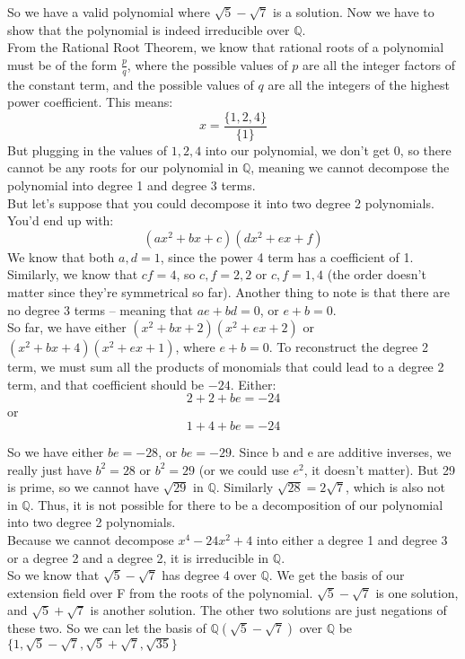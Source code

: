 \begin{enumerate}
\begin{enumerate}
        So we have a valid polynomial where $\sqrt{5} - \sqrt{7}$ is a solution. Now we have to show that the polynomial is indeed irreducible over $\mathds{Q}$.\\
        From the Rational Root Theorem, we know that rational roots of a polynomial must be of the form $\frac{p}{q}$, where the possible values of $p$ are all the integer factors of the constant term, and the possible values of $q$ are all the integers of the highest power coefficient. This means:
        $$x = \frac{\{1,2,4 \}}{\{1\}}$$
        But plugging in the values of $1,2,4$ into our polynomial, we don't get 0, so there cannot be any roots for our polynomial in $\mathds{Q}$, meaning we cannot decompose the polynomial into degree 1 and degree 3 terms.\\
        But let's suppose that you could decompose it into two degree 2 polynomials. You'd end up with:
        $$(ax^2+bx+c)(dx^2+ex+f)$$
        We know that both $a,d = 1$, since the power 4 term has a coefficient of 1. Similarly, we know that $cf = 4$, so $c,f = 2,2$ or $c,f = 1,4$ (the order doesn't matter since they're symmetrical so far). Another thing to note is that there are no degree 3 terms -- meaning that $ae + bd = 0$, or $e + b = 0$.\\
        So far, we have either $(x^2+bx+2)(x^2+ex+2)$ or $(x^2+bx+4)(x^2+ex+1)$, where $e+b = 0$.
        To reconstruct the degree 2 term, we must sum all the products of monomials that could lead to a degree 2 term, and that coefficient should be $-24$. Either:
        $$2+2+be = -24$$ 
        or
        $$1+4+be = -24$$

        So we have either $be = -28$, or $be = -29$. Since b and e are additive inverses, we really just have $b^2 = 28$ or $b^2 = 29$ (or we could use $e^2$, it doesn't matter). But 29 is prime, so we cannot have $\sqrt{29}$ in $\mathds{Q}$. Similarly $\sqrt{28} = 2\sqrt{7}$, which is also not in $\mathds{Q}$. Thus, it is not possible for there to be a decomposition of our polynomial into two degree 2 polynomials.\\

        Because we cannot decompose $x^4-24x^2+4$ into either a degree 1 and degree 3 or a degree 2 and a degree 2, it is irreducible in $\mathds{Q}$.\\

        So we know that $\sqrt{5} - \sqrt{7}$ has degree 4 over $\mathds{Q}$. We get the basis of our extension field over F from the roots of the polynomial. $\sqrt{5} - \sqrt{7}$ is one solution, and $\sqrt{5} + \sqrt{7}$ is another solution. The other two solutions are just negations of these two. So we can let the basis of $\mathds{Q}(\sqrt{5} - \sqrt{7})$ over $\mathds{Q}$ be $\{1, \sqrt{5}-\sqrt{7}, \sqrt{5} + \sqrt{7}, \sqrt{35}\}$\\



\end{enumerate}
\end{enumerate}
